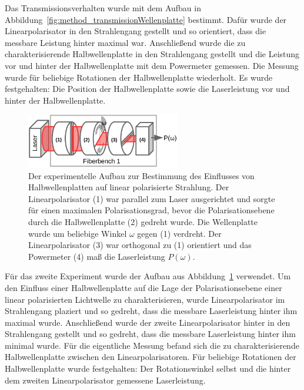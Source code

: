 \documentclass[a4paper,12pt,twoside,parskip=no,headsepline,open=right,ngerman,export]{scrreprt}
\begin{document}
            Das Transmissionsverhalten wurde mit dem Aufbau in Abbildung~\ref{fig:method_transmissionWellenplatte} bestimmt. Dafür wurde der Linearpolarisator  in den Strahlengang gestellt und so orientiert, dass die messbare Leistung hinter  maximal war. Anschließend wurde die zu charakterisierende Halbwellenplatte in den Strahlengang gestellt und die Leistung vor und hinter der Halbwellenplatte mit dem Powermeter gemessen. Die Messung wurde für beliebige Rotationen der Halbwellenplatte wiederholt. Es wurde festgehalten: Die Position der Halbwellenplatte sowie die Laserleistung vor und hinter der Halbwellenplatte.
            
            \begin{figure}[!b]
                \centering
                \includegraphics[width=0.6\textwidth]{img/aufbau_wellenplatte_rotation.pdf}
                \caption[Bestimmung des Einflusses von Halbwellenplatten auf Lichtwellen]{Der experimentelle Aufbau zur Bestimmung des Einflusses von Halbwellenplatten auf linear polarisierte Strahlung. Der Linearpolarisator (1) war parallel zum Laser ausgerichtet und sorgte für einen maximalen Polarisationsgrad, bevor die Polarisationsebene durch die Halbwellenplatte (2) gedreht wurde. Die Wellenplatte wurde um beliebige Winkel $\omega$ gegen (1) verdreht. Der Linearpolarisator (3) war orthogonal zu (1) orientiert und das Powermeter (4) maß die Laserleistung $P(\omega)$.}
                \label{fig:method_rotationWellenplatte}
            \end{figure}
            
            Für das zweite Experiment wurde der Aufbau aus Abbildung~\ref{fig:method_rotationWellenplatte} verwendet. Um den Einfluss einer Halbwellenplatte auf die Lage der Polarisationsebene einer linear polarisierten Lichtwelle zu charakterisieren, wurde Linearpolarisator  im Strahlengang plaziert und so gedreht, dass die messbare Laserleistung hinter ihm maximal wurde. Anschließend wurde der zweite Linearpolarisator  hinter  in den Strahlengang gestellt und so gedreht, dass die messbare Laserleistung hinter ihm minimal wurde. Für die eigentliche Messung befand sich die zu charakterisierende Halbwellenplatte zwischen den Linearpolarisatoren. Für beliebige Rotationen der Halbwellenplatte wurde festgehalten: Der Rotationswinkel selbst und die hinter dem zweiten Linearpolarisator gemessene Laserleistung.
            
\end{document}
